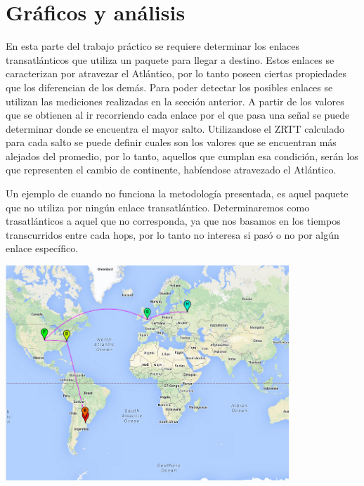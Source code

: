 \section{Gráficos y análisis}

En esta parte del trabajo práctico se requiere determinar los enlaces transatlánticos que utiliza un paquete para llegar a destino. Estos enlaces se caracterizan por atravezar el Atlántico, por lo tanto poseen ciertas propiedades que los diferencian de los demás. Para poder detectar los posibles enlaces se utilizan las mediciones realizadas en la seeción anterior. A partir de los valores que se obtienen al ir recorriendo cada enlace por el que pasa una señal se puede determinar donde se encuentra el mayor salto.
Utilizandose el ZRTT calculado para cada salto se puede definir cuales son los valores que se encuentran más alejados del promedio, por lo tanto, aquellos que cumplan esa condición, serán los que representen el cambio de continente, habíendose atravezado el Atlántico.

Un ejemplo de cuando no funciona la metodología presentada, es aquel paquete que no utiliza por ningún enlace transatlántico. Determinaremos como trasatlánticos a aquel que no corresponda, ya que nos basamos en los tiempos transcurridos entre cada hops, por lo tanto no interesa si pasó o no por algún enlace específico.


\centerline{\includegraphics[width=0.8\textwidth]{mapas/rusia.png}}

